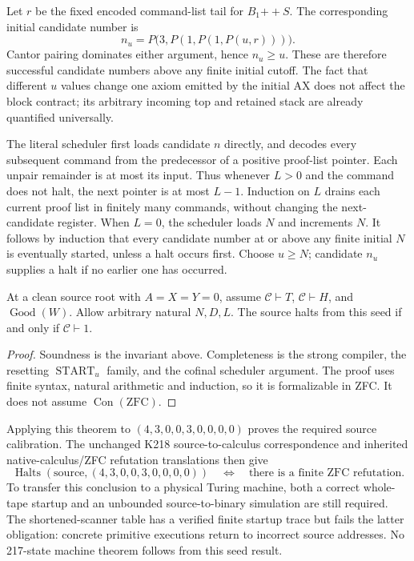 Let $r$ be the fixed encoded command-list tail for $B_1\mathbin{+\!+}S$.
The corresponding initial candidate number is
\[
 n_u=P\bigl(3,P(1,P(1,P(u,r)))\bigr).
\]
Cantor pairing dominates either argument, hence $n_u\geq u$. These are
therefore successful candidate numbers above any finite initial cutoff.
The fact that different $u$ values change one axiom emitted by the
initial AX does not affect the block contract; its arbitrary incoming
top and retained stack are already quantified universally.

The literal scheduler first loads candidate $n$ directly, and decodes
every subsequent command from the predecessor of a positive proof-list
pointer. Each unpair remainder is at most its input. Thus whenever
$L>0$ and the command does not halt, the next pointer is at most $L-1$.
Induction on $L$ drains each current proof list in finitely many
commands, without changing the next-candidate register. When $L=0$,
the scheduler loads $N$ and increments $N$. It follows by induction
that every candidate number at or above any finite initial $N$ is
eventually started, unless a halt occurs first. Choose $u\geq N$;
candidate $n_u$ supplies a halt if no earlier one has occurred.

\begin{theorem}
At a clean source root with $A=X=Y=0$, assume
$\mathcal C\vdash T$, $\mathcal C\vdash H$, and $\operatorname{Good}(W)$.
Allow arbitrary natural $N,D,L$. The source halts from this seed if and
only if $\mathcal C\vdash1$.
\end{theorem}
\begin{proof}
Soundness is the invariant above. Completeness is the strong compiler,
the resetting $\operatorname{START}_u$ family, and the cofinal scheduler
argument. The proof uses finite syntax, natural arithmetic and induction,
so it is formalizable in ZFC. It does not assume $\operatorname{Con}(\mathrm{ZFC})$.
\end{proof}

Applying this theorem to $(4,3,0,0,3,0,0,0,0)$ proves the required source
calibration. The unchanged K218 source-to-calculus correspondence and
inherited native-calculus/ZFC refutation translations then give
\[
 \operatorname{Halts}(\text{source},(4,3,0,0,3,0,0,0,0))
 \quad\Longleftrightarrow\quad
 \text{there is a finite ZFC refutation}.
\]
To transfer this conclusion to a physical Turing machine, both a correct
whole-tape startup and an unbounded source-to-binary simulation are still
required. The shortened-scanner table has a verified finite startup
trace but fails the latter obligation: concrete primitive executions
return to incorrect source addresses. No 217-state machine theorem
follows from this seed result.
